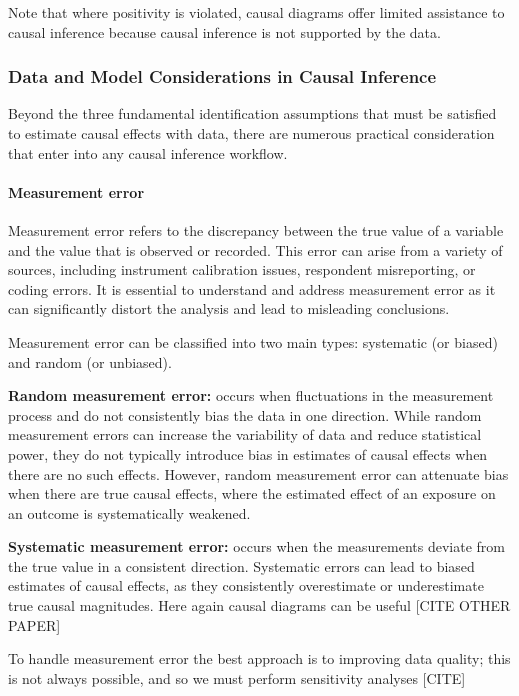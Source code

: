 \documentclass[
  singlecolumn,
  9pt]{article}
\let\oldparagraph\paragraph
\renewcommand{\paragraph}[1]{\oldparagraph{#1}\mbox{}}
\begin{document}
Note that where positivity is violated, causal diagrams offer limited
assistance to causal inference because causal inference is not supported
by the data.

\subsubsection{Data and Model Considerations in Causal
Inference}\label{data-and-model-considerations-in-causal-inference}

Beyond the three fundamental identification assumptions that must be
satisfied to estimate causal effects with data, there are numerous
practical consideration that enter into any causal inference workflow.

\paragraph{Measurement error}\label{measurement-error}

Measurement error refers to the discrepancy between the true value of a
variable and the value that is observed or recorded. This error can
arise from a variety of sources, including instrument calibration
issues, respondent misreporting, or coding errors. It is essential to
understand and address measurement error as it can significantly distort
the analysis and lead to misleading conclusions.

Measurement error can be classified into two main types: systematic (or
biased) and random (or unbiased).

\textbf{Random measurement error:} occurs when fluctuations in the
measurement process and do not consistently bias the data in one
direction. While random measurement errors can increase the variability
of data and reduce statistical power, they do not typically introduce
bias in estimates of causal effects when there are no such effects.
However, random measurement error can attenuate bias when there are true
causal effects, where the estimated effect of an exposure on an outcome
is systematically weakened.

\textbf{Systematic measurement error:} occurs when the measurements
deviate from the true value in a consistent direction. Systematic errors
can lead to biased estimates of causal effects, as they consistently
overestimate or underestimate true causal magnitudes. Here again causal
diagrams can be useful {[}CITE OTHER PAPER{]}

To handle measurement error the best approach is to improving data
quality; this is not always possible, and so we must perform sensitivity
analyses {[}CITE{]}
\end{document}
